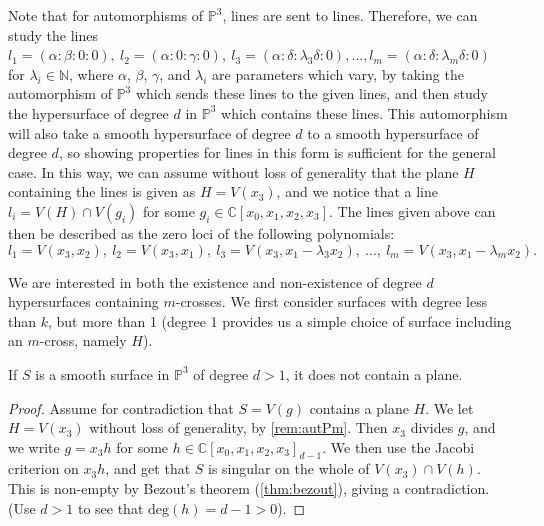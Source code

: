 \begin{remark}\label{rem:autPm}
    Note that for automorphisms of $\mathbb{P}^3$, lines are sent to lines. Therefore, we can study the lines $l_1 = (\alpha : \beta : 0 : 0), \ l_2 = (\alpha : 0 : \gamma : 0), \ l_3=(\alpha: \delta : \lambda_3 \delta: 0), \dots, l_m = (\alpha : \delta : \lambda_m \delta : 0)$ for $\lambda_i \in \mathbb{N}$, where $\alpha$, $\beta$, $\gamma$, and $\lambda_i$ are parameters which vary, by taking the automorphism of $\mathbb{P}^3$ which sends these lines to the given lines, and then study the hypersurface of degree $d$ in $\mathbb{P}^3$ which contains these lines. This automorphism will also take a smooth hypersurface of degree $d$ to a smooth hypersurface of degree $d$, so showing properties for lines in this form is sufficient for the general case. In this way, we can assume without loss of generality that the plane $H$ containing the lines is given as $H = V(x_3)$, and we notice that a line $l_i = V(H)\cap V(g_i)$ for some $g_i \in \mathbb{C}[x_0,x_1,x_2,x_3]$. The lines given above can then be described as the zero loci of the following polynomials: 
    \begin{equation}\label{eq:li}
        l_1 = V(x_3, x_2), \ l_2 = V(x_3, x_1), \ l_3 = V(x_3, x_1 - \lambda_3 x_2), \ \dots, \ l_m = V(x_3, x_1 - \lambda_m x_2).
    \end{equation}
\end{remark}

We are interested in both the existence and non-existence of degree $d$ hypersurfaces containing $m$-crosses. We first consider surfaces with degree less than $k$, but more than 1 (degree 1 provides us a simple choice of surface including an $m$-cross, namely $H$).

\begin{lemma}\label{lem:H}
    If $S$ is a smooth surface in $\mathbb{P}^3$ of degree $d > 1$, it does not contain a plane.
\end{lemma}
\begin{proof}
    Assume for contradiction that $S = V(g)$ contains a plane $H$. We let $H = V(x_3)$ without loss of generality, by \cref{rem:autPm}. Then $x_3$ divides $g$, and we write $g = x_3 h$ for some $h \in \mathbb{C}[x_0,x_1,x_2,x_3]_{d-1}$. We then use the Jacobi criterion \cite[Proposition 16.16]{EO25} on $x_3 h$, and get that $S$ is singular on the whole of $V(x_3) \cap V(h)$. This is non-empty by Bezout's theorem (\cref{thm:bezout}), giving a contradiction. (Use $d>1$ to see that $\text{deg}(h) = d-1 > 0$). 
\end{proof}

